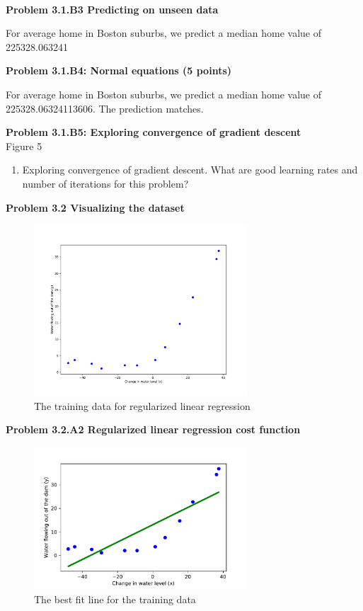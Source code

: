 \documentclass[]{book}
\theoremstyle{definition}
\begin{document}
\\
\textbf{Problem 3.1.B3 Predicting on unseen data}
\begin{flushleft}
	For average home in Boston suburbs, we predict a median home value of 225328.063241
\end{flushleft}
\textbf{Problem 3.1.B4: Normal equations (5 points)}
\begin{flushleft}
	For average home in Boston suburbs, we predict a median home value of 225328.06324113606. The prediction matches.
\end{flushleft}
\textbf{Problem 3.1.B5: Exploring convergence of gradient descent}\\
Figure 5
\begin{enumerate}
	\item Exploring convergence of gradient descent. What are good learning rates and number of iterations for this problem?	
\end{enumerate}
\textbf{Problem 3.2 Visualizing the dataset}
\begin{figure}[H]
	\centering
	\includegraphics[width=8cm]{fig6.pdf}
	\caption{The training data for regularized linear regression}
	\label{fig:6}
\end{figure}

\textbf{Problem 3.2.A2 Regularized linear regression cost function}
\begin{figure}[H]
	\centering
	\includegraphics[width=8cm]{fig7.pdf}
	\caption{The best fit line for the training data}
	\label{fig:7}
\end{figure}
\end{document}

